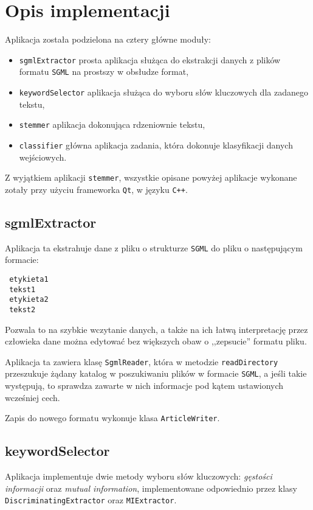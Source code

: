 \documentclass{classrep}
\begin{document}
\section{Opis implementacji}
Aplikacja została podzielona na cztery główne moduły:
\begin{itemize}
 \item \verb|sgmlExtractor| \ppauza prosta aplikacja służąca do ekstrakcji danych z plików formatu \verb|SGML| na prostszy w obsłudze format,
 \item \verb|keywordSelector| \ppauza aplikacja służąca do wyboru słów kluczowych dla zadanego tekstu,
 \item \verb|stemmer| \ppauza aplikacja dokonująca rdzeniownie tekstu,
 \item \verb|classifier| \ppauza główna aplikacja zadania, która dokonuje klasyfikacji danych wejściowych.
\end{itemize}
Z wyjątkiem aplikacji \verb|stemmer|, wszystkie opisane powyżej aplikacje wykonane zotały przy użyciu frameworka \verb|Qt|, w języku \verb|C++|.

\subsection{sgmlExtractor}
Aplikacja ta ekstrahuje dane z pliku o strukturze \verb|SGML| do pliku o następującym formacie:
\begin{verbatim}
 etykieta1
 tekst1
 etykieta2
 tekst2
\end{verbatim}
Pozwala to na szybkie wczytanie danych, a także na ich łatwą interpretację przez człowieka \ppauza dane można edytować bez większych obaw o ,,zepsucie'' formatu pliku.

Aplikacja ta zawiera klasę \verb|SgmlReader|, która w metodzie \verb|readDirectory| przeszukuje żądany katalog w poszukiwaniu plików w formacie \verb|SGML|, a jeśli takie występują, to sprawdza zawarte w nich informacje pod kątem ustawionych wcześniej cech.

Zapis do nowego formatu wykonuje klasa \verb|ArticleWriter|.

\subsection{keywordSelector}
Aplikacja implementuje dwie metody wyboru słów kluczowych: \textit{gęstości informacji} oraz \textit{mutual information}, implementowane odpowiednio przez klasy   \verb|DiscriminatingExtractor| oraz \verb|MIExtractor|.
\end{document}
